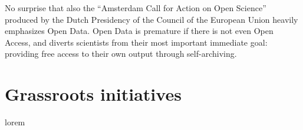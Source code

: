 \documentclass[11pt, openany, oneside, article, a4paper, twocolumn]{memoir}
\begin{document}
No surprise that also the \enquote{Amsterdam Call for Action on Open Science}
\cite{amsterdam_call} produced by the Dutch Presidency of the Council of the
European Union heavily emphasizes Open Data. Open Data is premature if there is
not even Open Access, and diverts scientists from their most important
immediate goal: providing free access to their own output through self-archiving.

\section{Grassroots initiatives}

lorem

\printbibliography
\end{document}
